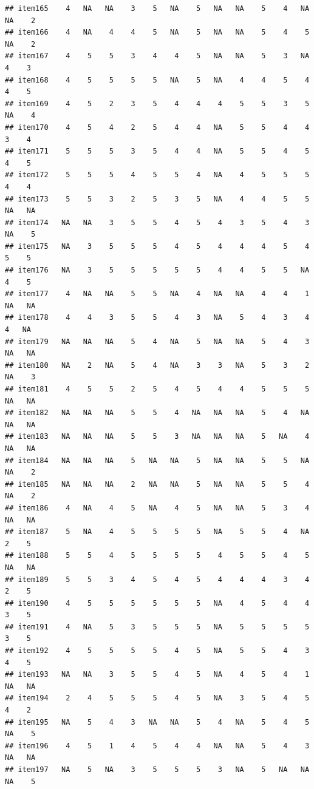 \documentclass[
  man]{apa6}
\begin{document}
\begin{verbatim}
## item165    4   NA   NA    3    5   NA    5   NA   NA    5    4   NA   NA    2
## item166    4   NA    4    4    5   NA    5   NA   NA    5    4    5   NA    2
## item167    4    5    5    3    4    4    5   NA   NA    5    3   NA    4    3
## item168    4    5    5    5    5   NA    5   NA    4    4    5    4    4    5
## item169    4    5    2    3    5    4    4    4    5    5    3    5   NA    4
## item170    4    5    4    2    5    4    4   NA    5    5    4    4    3    4
## item171    5    5    5    3    5    4    4   NA    5    5    4    5    4    5
## item172    5    5    5    4    5    5    4   NA    4    5    5    5    4    4
## item173    5    5    3    2    5    3    5   NA    4    4    5    5   NA   NA
## item174   NA   NA    3    5    5    4    5    4    3    5    4    3   NA    5
## item175   NA    3    5    5    5    4    5    4    4    4    5    4    5    5
## item176   NA    3    5    5    5    5    5    4    4    5    5   NA    4    5
## item177    4   NA   NA    5    5   NA    4   NA   NA    4    4    1   NA   NA
## item178    4    4    3    5    5    4    3   NA    5    4    3    4    4   NA
## item179   NA   NA   NA    5    4   NA    5   NA   NA    5    4    3   NA   NA
## item180   NA    2   NA    5    4   NA    3    3   NA    5    3    2   NA    3
## item181    4    5    5    2    5    4    5    4    4    5    5    5   NA   NA
## item182   NA   NA   NA    5    5    4   NA   NA   NA    5    4   NA   NA   NA
## item183   NA   NA   NA    5    5    3   NA   NA   NA    5   NA    4   NA   NA
## item184   NA   NA   NA    5   NA   NA    5   NA   NA    5    5   NA   NA    2
## item185   NA   NA   NA    2   NA   NA    5   NA   NA    5    5    4   NA    2
## item186    4   NA    4    5   NA    4    5   NA   NA    5    3    4   NA   NA
## item187    5   NA    4    5    5    5    5   NA    5    5    4   NA    2    5
## item188    5    5    4    5    5    5    5    4    5    5    4    5   NA   NA
## item189    5    5    3    4    5    4    5    4    4    4    3    4    2    5
## item190    4    5    5    5    5    5    5   NA    4    5    4    4    3    5
## item191    4   NA    5    3    5    5    5   NA    5    5    5    5    3    5
## item192    4    5    5    5    5    4    5   NA    5    5    4    3    4    5
## item193   NA   NA    3    5    5    4    5   NA    4    5    4    1   NA   NA
## item194    2    4    5    5    5    4    5   NA    3    5    4    5    4    2
## item195   NA    5    4    3   NA   NA    5    4   NA    5    4    5   NA    5
## item196    4    5    1    4    5    4    4   NA   NA    5    4    3   NA   NA
## item197   NA    5   NA    3    5    5    5    3   NA    5   NA   NA   NA    5

\end{verbatim}
\end{document}
